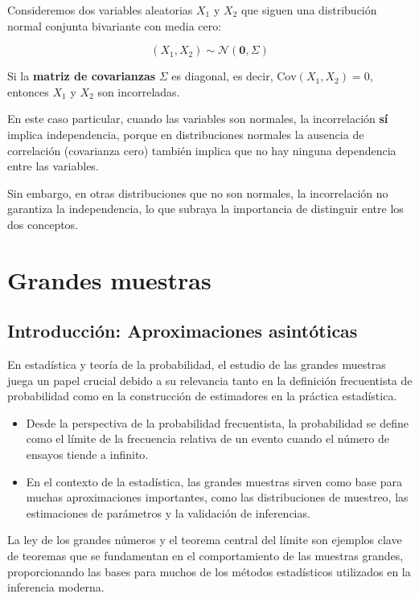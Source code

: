 \documentclass[
]{article}
\begin{document}
Consideremos dos variables aleatorias \(X_1\) y \(X_2\) que siguen una distribución normal conjunta bivariante con media cero:

\[
(X_1, X_2) \sim \mathcal{N}\left(\mathbf{0}, \Sigma \right)
\]

Si la \textbf{matriz de covarianzas} \(\Sigma\) es diagonal, es decir, \(\text{Cov}(X_1, X_2) = 0\), entonces \(X_1\) y \(X_2\) son incorreladas.

En este caso particular, cuando las variables son normales, la incorrelación \textbf{sí} implica independencia, porque en distribuciones normales la ausencia de correlación (covarianza cero) también implica que no hay ninguna dependencia entre las variables.

Sin embargo, en otras distribuciones que no son normales, la incorrelación no garantiza la independencia, lo que subraya la importancia de distinguir entre los dos conceptos.

\newpage

\section{Grandes muestras}\label{grandes-muestras}

\subsection{Introducción: Aproximaciones asintóticas}\label{introducciuxf3n-aproximaciones-asintuxf3ticas}

En estadística y teoría de la probabilidad, el estudio de las grandes muestras juega un papel crucial debido a su relevancia tanto en la definición frecuentista de probabilidad como en la construcción de estimadores en la práctica estadística.

\begin{itemize}
\item
  Desde la perspectiva de la probabilidad frecuentista, la probabilidad se define como el límite de la frecuencia relativa de un evento cuando el número de ensayos tiende a infinito.
\item
  En el contexto de la estadística, las grandes muestras sirven como base para muchas aproximaciones importantes, como las distribuciones de muestreo, las estimaciones de parámetros y la validación de inferencias.
\end{itemize}

La ley de los grandes números y el teorema central del límite son ejemplos clave de teoremas que se fundamentan en el comportamiento de las muestras grandes, proporcionando las bases para muchos de los métodos estadísticos utilizados en la inferencia moderna.
\end{document}
